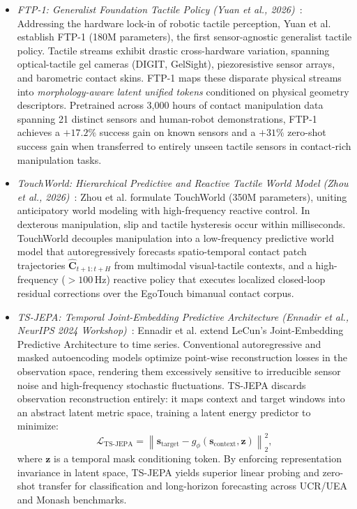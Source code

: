 \begin{itemize}[leftmargin=*]
    \item \emph{FTP-1: Generalist Foundation Tactile Policy (Yuan et al., 2026)}~\cite{yuan2026ftp1}: Addressing the hardware lock-in of robotic tactile perception, Yuan et al. establish FTP-1 (180M parameters), the first sensor-agnostic generalist tactile policy. Tactile streams exhibit drastic cross-hardware variation, spanning optical-tactile gel cameras (DIGIT, GelSight), piezoresistive sensor arrays, and barometric contact skins. FTP-1 maps these disparate physical streams into \emph{morphology-aware latent unified tokens} conditioned on physical geometry descriptors. Pretrained across 3,000 hours of contact manipulation data spanning 21 distinct sensors and human-robot demonstrations, FTP-1 achieves a $+17.2\%$ success gain on known sensors and a $+31\%$ zero-shot success gain when transferred to entirely unseen tactile sensors in contact-rich manipulation tasks.

    \item \emph{TouchWorld: Hierarchical Predictive and Reactive Tactile World Model (Zhou et al., 2026)}~\cite{zhou2026touchworld}: Zhou et al. formulate TouchWorld (350M parameters), uniting anticipatory world modeling with high-frequency reactive control. In dexterous manipulation, slip and tactile hysteresis occur within milliseconds. TouchWorld decouples manipulation into a low-frequency predictive world model that autoregressively forecasts spatio-temporal contact patch trajectories $\hat{\mathbf{C}}_{t+1:t+H}$ from multimodal visual-tactile contexts, and a high-frequency ($>100\,\text{Hz}$) reactive policy that executes localized closed-loop residual corrections over the EgoTouch bimanual contact corpus.

    \item \emph{TS-JEPA: Temporal Joint-Embedding Predictive Architecture (Ennadir et al., NeurIPS 2024 Workshop)}~\cite{ennadir2025tsjepa}: Ennadir et al. extend LeCun's Joint-Embedding Predictive Architecture to time series. Conventional autoregressive and masked autoencoding models optimize point-wise reconstruction losses in the observation space, rendering them excessively sensitive to irreducible sensor noise and high-frequency stochastic fluctuations. TS-JEPA discards observation reconstruction entirely: it maps context and target windows into an abstract latent metric space, training a latent energy predictor to minimize:
    \begin{equation}
        \mathcal{L}_{\text{TS-JEPA}} = \left\| \mathbf{s}_{\text{target}} - g_\phi(\mathbf{s}_{\text{context}}, \mathbf{z}) \right\|_2^2,
    \end{equation}
    where $\mathbf{z}$ is a temporal mask conditioning token. By enforcing representation invariance in latent space, TS-JEPA yields superior linear probing and zero-shot transfer for classification and long-horizon forecasting across UCR/UEA and Monash benchmarks.


\end{itemize}
